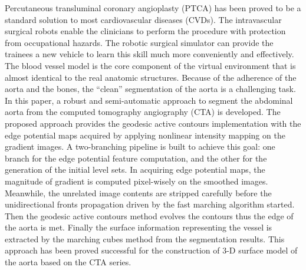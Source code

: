 
Percutaneous transluminal coronary angioplasty (PTCA) has been proved to be a standard solution to most cardiovascular diseases (CVDs).
The intravascular surgical robots enable the clinicians to perform the procedure with protection from occupational hazards.
The robotic surgical simulator can provide the trainees a new vehicle to learn this skill much more conveniently and effectively.
The blood vessel model is the core component of the virtual environment that is almost identical to the real anatomic structures.
Because of the adherence of the aorta and the bones, the ``clean'' segmentation of the aorta is a challenging task.
In this paper, a robust and semi-automatic approach to segment the abdominal aorta from the computed tomography angiography (CTA) is developed.
The proposed approach provides the geodesic active contours implementation with the edge potential maps acquired by applying nonlinear intensity mapping on the gradient images.
A two-branching pipeline is built to achieve this goal: one branch for the edge potential feature computation, and the other for the generation of the initial level sets.
In acquiring edge potential maps, the magnitude of gradient is computed pixel-wisely on the smoothed images.
Meanwhile, the unrelated image contents are stripped carefully before the unidirectional fronts propagation driven by the fast marching algorithm started.
Then the geodesic active contours method evolves the contours thus the edge of the aorta is met.
Finally the surface information representing the vessel is extracted by the marching cubes method from the segmentation results.
This approach has been proved successful for the construction of 3-D surface model of the aorta based on the CTA series.

